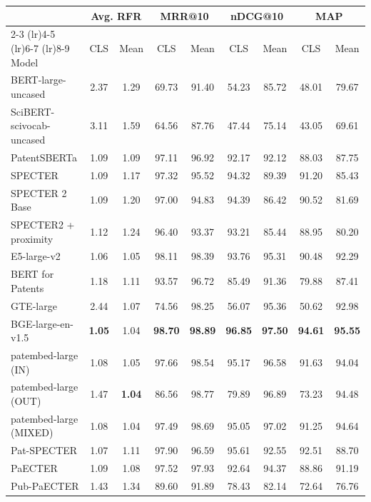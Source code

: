 \begin{tabular}{l cc cc cc cc}
    \toprule
    & \multicolumn{2}{c}{Avg. RFR} & \multicolumn{2}{c}{MRR@10} & \multicolumn{2}{c}{nDCG@10} & \multicolumn{2}{c}{MAP} \\
    \cmidrule(lr){2-3} \cmidrule(lr){4-5} \cmidrule(lr){6-7} \cmidrule(lr){8-9}
Model & CLS & Mean & CLS & Mean & CLS & Mean & CLS & Mean \\
    \midrule
    BERT-large-uncased & 2.37 & 1.29 & 69.73 & 91.40 & 54.23 & 85.72 & 48.01 & 79.67 \\
    SciBERT-scivocab-uncased & 3.11 & 1.59 & 64.56 & 87.76 & 47.44 & 75.14 & 43.05 & 69.61 \\
    PatentSBERTa & 1.09 & 1.09 & 97.11 & 96.92 & 92.17 & 92.12 & 88.03 & 87.75 \\
    SPECTER & 1.09 & 1.17 & 97.32 & 95.52 & 94.32 & 89.39 & 91.20 & 85.43 \\
    SPECTER 2 Base & 1.09 & 1.20 & 97.00 & 94.83 & 94.39 & 86.42 & 90.52 & 81.69 \\
    SPECTER2 + proximity & 1.12 & 1.24 & 96.40 & 93.37 & 93.21 & 85.44 & 88.95 & 80.20 \\
    E5-large-v2 & 1.06 & 1.05 & 98.11 & 98.39 & 93.76 & 95.31 & 90.48 & 92.29 \\
    BERT for Patents & 1.18 & 1.11 & 93.57 & 96.72 & 85.49 & 91.36 & 79.88 & 87.41 \\
    GTE-large & 2.44 & 1.07 & 74.56 & 98.25 & 56.07 & 95.36 & 50.62 & 92.98 \\
    BGE-large-en-v1.5 & \textbf{1.05} & 1.04 & \textbf{98.70} & \textbf{98.89} & \textbf{96.85} & \textbf{97.50} & \textbf{94.61} & \textbf{95.55} \\
    patembed-large (IN) & 1.08 & 1.05 & 97.66 & 98.54 & 95.17 & 96.58 & 91.63 & 94.04 \\
    patembed-large (OUT) & 1.47 & \textbf{1.04} & 86.56 & 98.77 & 79.89 & 96.89 & 73.23 & 94.48 \\
    patembed-large (MIXED) & 1.08 & 1.04 & 97.49 & 98.69 & 95.05 & 97.02 & 91.25 & 94.64 \\
    Pat-SPECTER & 1.07 & 1.11 & 97.90 & 96.59 & 95.61 & 92.55 & 92.51 & 88.70 \\
    PaECTER & 1.09 & 1.08 & 97.52 & 97.93 & 92.64 & 94.37 & 88.86 & 91.19 \\
    Pub-PaECTER & 1.43 & 1.34 & 89.60 & 91.89 & 78.43 & 82.14 & 72.64 & 76.76 \\
    \bottomrule
\end{tabular}
